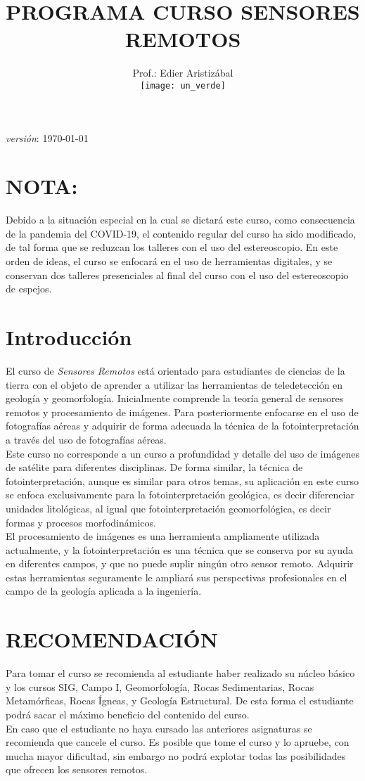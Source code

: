 \documentclass[a4paper,twoside,11pt,]{article}
\title {PROGRAMA  CURSO SENSORES REMOTOS}
\author{Prof.: Edier Aristizábal\\[5ex]
\texttt{[image: un\_verde]}
}
\date{}
\begin{document}
\maketitle

\emph {versión}: \today

\section*{NOTA:}
Debido a la situación especial en la cual se dictará este curso, como consecuencia de la pandemia del COVID-19, el contenido regular del curso ha sido modificado,
de tal forma que se reduzcan los talleres con el uso del estereoscopio. En este orden de ideas, el curso se enfocará en el uso de herramientas
digitales, y se conservan dos talleres presenciales al final del curso con el uso del estereoscopio de espejos.

\section* {Introducción}
El curso de \emph{Sensores Remotos} está orientado para estudiantes de ciencias de la tierra con el objeto de aprender a utilizar las herramientas de teledetección en geología y geomorfología. Inicialmente comprende la teoría general de sensores remotos y procesamiento de imágenes. Para posteriormente enfocarse en el uso de fotografías aéreas y adquirir de forma adecuada la técnica de la fotointerpretación a través del uso de fotografías aéreas.\\ 
Este curso no corresponde a un curso a profundidad y detalle del uso de imágenes de satélite para diferentes disciplinas. De forma similar, la técnica de fotointerpretación, aunque es similar para otros temas, su aplicación en este curso se enfoca exclusivamente para la fotointerpretación geológica, es decir diferenciar unidades litológicas, al igual que fotointerpretación geomorfológica, es decir formas y procesos morfodinámicos.\\
El procesamiento de imágenes es una herramienta ampliamente utilizada actualmente, y la fotointerpretación es una técnica que se conserva por su ayuda en diferentes campos, y que no puede suplir ningún otro sensor remoto. Adquirir estas herramientas seguramente le ampliará sus perspectivas profesionales en el campo de la geología aplicada a la ingeniería.

\section{RECOMENDACIÓN}
Para tomar el curso se recomienda al estudiante haber realizado su núcleo básico y los cursos SIG, Campo I, Geomorfología, Rocas Sedimentarias, Rocas Metamórficas, Rocas Ígneas, y Geología Estructural. De esta forma el estudiante podrá sacar el máximo beneficio del contenido del curso.\\
En caso que el estudiante no haya cursado las anteriores asignaturas se recomienda que cancele el curso. Es posible que tome el curso y lo apruebe, con mucha mayor dificultad, sin embargo no podrá explotar todas las posibilidades que ofrecen los sensores remotos.
\end{document}
